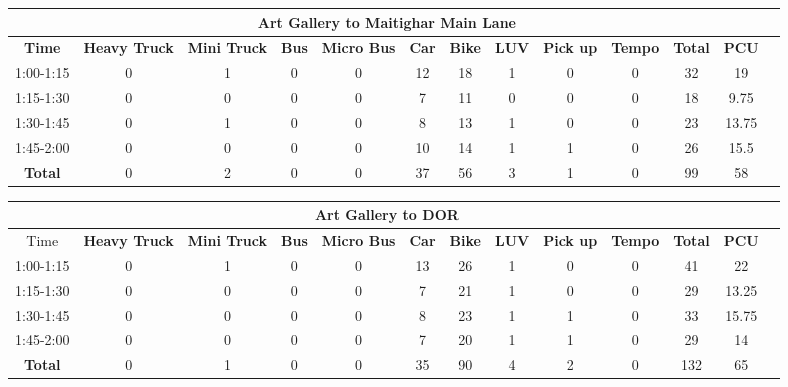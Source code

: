 \begin{landscape}
\centering
\begin{table}[h!]
\centering
\begin{tabular}{|c|c|c|c|c|c|c|c|c|c|c|c|c|}
    \hline
    \multicolumn{12}{|c|}{\textbf{Art Gallery to Maitighar Main Lane}} \\
    \hline
    \textbf{Time} & \textbf{Heavy Truck} & \textbf{Mini Truck} & \textbf{Bus} & \textbf{Micro Bus} & \textbf{Car} & \textbf{Bike} & \textbf{LUV} & \textbf{Pick up} & \textbf{Tempo} & \textbf{\textbf{Total}} & \textbf{PCU} \\
    \hline
1:00-1:15	&0	&1	&0	&0	&12	&18	&1	&0	&0	&32	&19 \\ \hline
1:15-1:30	&0	&0	&0	&0	&7	&11	&0	&0	&0	&18	&9.75 \\ \hline
1:30-1:45	&0	&1	&0	&0	&8	&13	&1	&0	&0	&23	&13.75 \\ \hline
1:45-2:00	&0	&0	&0	&0	&10	&14	&1	&1	&0	&26	&15.5 \\ \hline
\textbf{Total}	&0	&2	&0	&0	&37	&56	&3	&1	&0	&99	&58 \\ \hline


\end{tabular}

\vspace{0.5cm}

\begin{tabular}{|c|c|c|c|c|c|c|c|c|c|c|c|c|}
    \hline
    \multicolumn{12}{|c|}{\textbf{Art Gallery to DOR}} \\
    \hline
        Time & \textbf{Heavy Truck} & \textbf{Mini Truck} & \textbf{Bus} & \textbf{Micro Bus} & \textbf{Car} & \textbf{Bike} & \textbf{LUV} & \textbf{Pick up} & \textbf{Tempo} & \textbf{\textbf{Total}} & \textbf{PCU} \\
    \hline
1:00-1:15	&0	&1	&0	&0	&13	&26	&1	&0	&0	&41	&22 \\ \hline
1:15-1:30	&0	&0	&0	&0	&7	&21	&1	&0	&0	&29	&13.25 \\ \hline
1:30-1:45	&0	&0	&0	&0	&8	&23	&1	&1	&0	&33	&15.75 \\ \hline
1:45-2:00	&0	&0	&0	&0	&7	&20	&1	&1	&0	&29	&14 \\ \hline
\textbf{Total}	&0	&1	&0	&0	&35	&90	&4	&2	&0	&132	&65 \\ \hline

\end{tabular}


\end{table}
\end{landscape}
